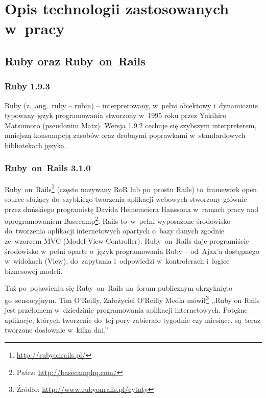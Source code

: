 \section{Opis technologii zastosowanych w~pracy}


\subsection{Ruby oraz Ruby~on~Rails} \label{technologie.baza}

\subsubsection{Ruby 1.9.3} \label{technologie.ruby}

Ruby (z.~ang.~ruby -- rubin) -- interpretowany, w~pełni obiektowy i~dynamicznie typowany język programowania stworzony w~1995 roku przez Yukihiro Matsumoto (pseudonim Matz). Wersja 1.9.2 cechuje się szybszym interpreterem, mniejszą konsumpcją zasobów oraz drobnymi poprawkami w~standardowych bibliotekach języka.

\subsubsection{Ruby~on~Rails 3.1.0} \label{technologie.ror}

Ruby~on~Rails\footnote{\url{http://rubyonrails.pl/}} (często nazywany RoR lub po~prostu Rails) to~framework open source służący do~szybkiego tworzenia aplikacji webowych stworzony głównie przez duńskiego programistę Davida Heinemeiera Hanssona w~ramach pracy nad oprogramowaniem Basecamp\footnote{Patrz: \url{http://basecamphq.com/}}. Rails to~w~pełni wyposażone środowisko do~tworzenia aplikacji internetowych opartych o~bazy danych zgodnie ze~wzorcem MVC (Model-View-Controller). Ruby~on~Rails daje programiście środowisko w~pełni oparte o~język programowania Ruby -- od~Ajax'a dostępnego w~widokach (View), do~zapytania i~odpowiedzi w~kontrolerach i~logice biznesowej modeli.


Tuż po~pojawieniu się Ruby~on~Rails na~forum publicznym okrzyknięto go~sensacyjnym. Tim O'Reilly, Założyciel O'Reilly Media mówił\footnote{Źródło: \url{http://www.rubyonrails.pl/cytaty}} ,,Ruby on Rails jest przełomem w~dziedzinie programowania aplikacji internetowych. Potężne aplikacje, których tworzenie do~tej pory zabierało tygodnie czy miesiące, są~teraz tworzone dosłownie w~kilka dni.''


